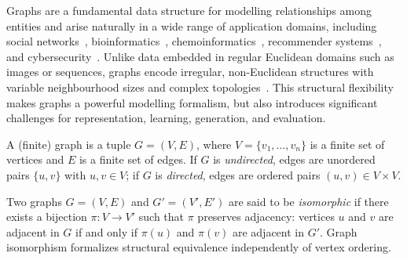 Graphs are a fundamental data structure for modelling relationships among entities
and arise naturally in a wide range of application domains, including social
networks~\citep{newman2003structure}, bioinformatics~\citep{borgwardt2005protein},
chemoinformatics~\citep{weininger1988smiles}, recommender systems~\citep{ying2018graph},
and cybersecurity~\citep{10.1145/310889.310919}. Unlike data embedded in regular
Euclidean domains such as images or sequences, graphs encode irregular,
non-Euclidean structures with variable neighbourhood sizes and complex
topologies~\citep{bronstein2017geometric}. This structural flexibility makes graphs
a powerful modelling formalism, but also introduces significant challenges for
representation, learning, generation, and evaluation.
\begin{definition}[Graph]
A (finite) graph is a tuple $G=(V,E)$, where
$V=\{v_1,\dots,v_n\}$ is a finite set of vertices and \(E\) is a finite
set of edges. If $G$ is \emph{undirected}, edges are unordered pairs
$\{u,v\}$ with \(u,v\in V\); if $G$ is \emph{directed}, edges are ordered
pairs $(u,v)\in V\times V$.
\end{definition}
\begin{definition}
Two graphs $G=(V,E)$ and $G'=(V',E')$ are said to be \emph{isomorphic}
if there exists a bijection $\pi: V \to V'$ such that
\(\pi\) preserves adjacency: vertices \(u\) and \(v\) are adjacent in \(G\)
if and only if \(\pi(u)\) and \(\pi(v)\) are adjacent in \(G'\). Graph
isomorphism formalizes structural equivalence independently of
vertex ordering.
\end{definition}
